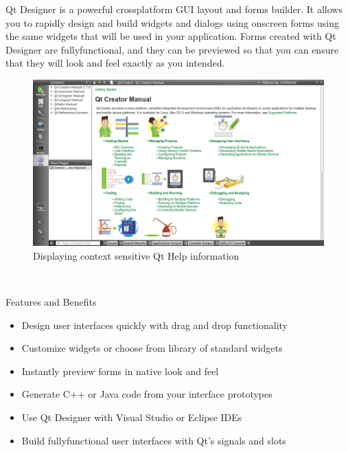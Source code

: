 Qt  Designer  is  a  powerful cross­platform GUI layout and forms builder. It allows you to rapidly design
and  build  widgets  and  dialogs  using  on­screen  forms  using  the  same  widgets  that  will  be  used  in  your
application.  Forms  created  with  Qt  Designer  are fully­functional, and they can be previewed so that you
can ensure that they will look and feel exactly as you intended.

\newpage
\begin{figure}[htb]
\begin{center}
\includegraphics[scale=0.4]{images/Qtman.png}
\caption{ Displaying context sensitive Qt Help information}
\end{center}
\end{figure}

\

\begin{small}
\large Features and Benefits
\end{small}
\begin{itemize}
\item Design user interfaces quickly with drag and drop functionality
\item Customize widgets or choose from library of standard widgets
\item Instantly preview forms in native look and feel
\item Generate C++ or Java code from your interface prototypes
\item Use Qt Designer with Visual Studio or Eclipse IDEs
\item Build fully­functional user interfaces with Qt’s signals and slots
\end{itemize}